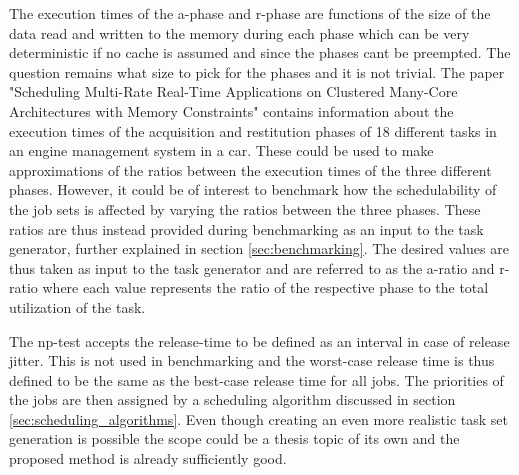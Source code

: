 \documentclass{kththesis}
\begin{document}
The execution times of the \acrshort{a}-phase and \acrshort{r}-phase are functions of the size of
the data read and written to the memory during each phase which can be very deterministic if no
cache is assumed and since the phases cant be preempted. The question remains what size to pick
for the phases and it is not trivial. The paper "Scheduling Multi-Rate Real-Time Applications on
Clustered Many-Core Architectures with Memory Constraints"\parencite{becker_scheduling_2018}
contains information about the execution times of the acquisition and restitution phases of 18
different tasks in an engine management system in a car. These could be used to make approximations
of the ratios between the execution times of the three different phases. However, it could be of
interest to benchmark how the schedulability of the job sets is affected by varying the ratios
between the three phases. These ratios are thus instead provided during benchmarking as an input to
the task generator, further explained in section \ref{sec:benchmarking}. The desired values are thus
taken as input to the task generator and are referred to as the \acrshort{a}-ratio and
\acrshort{r}-ratio where each value represents the ratio of the respective phase to the total
utilization of the task.


The \acrshort{np}-test accepts the release-time to be defined as an interval in case of release
jitter. This is not used in benchmarking and the worst-case release time is thus defined to be
the same as the best-case release time for all jobs. The priorities of the jobs are then
assigned by a scheduling algorithm discussed in section \ref{sec:scheduling_algorithms}. Even though
creating an even more realistic task set generation is possible the scope could be a thesis topic of
its own and the proposed method is already sufficiently good.

\end{document}

